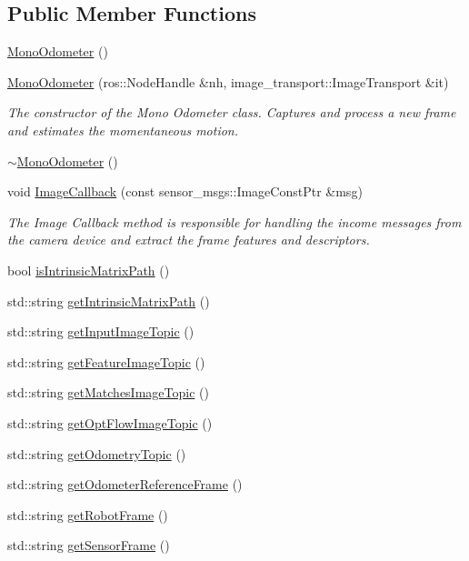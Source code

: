 \subsection*{\-Public \-Member \-Functions}
\begin{DoxyCompactItemize}
\item 
\hyperlink{classLRM_1_1MonoOdometer_a1ea1f329885905fcab0e3f790253df9d}{\-Mono\-Odometer} ()
\item 
\hyperlink{classLRM_1_1MonoOdometer_ae849abdcd3e0b49be6b1672b292c86ba}{\-Mono\-Odometer} (ros\-::\-Node\-Handle \&nh, image\-\_\-transport\-::\-Image\-Transport \&it)
\begin{DoxyCompactList}\small\item\em \-The constructor of the \-Mono \-Odometer class. \-Captures and process a new frame and estimates the momentaneous motion. \end{DoxyCompactList}\item 
\hyperlink{classLRM_1_1MonoOdometer_aadca97effbd3970022f8fdfa42c1177b}{$\sim$\-Mono\-Odometer} ()
\item 
void \hyperlink{classLRM_1_1MonoOdometer_a7205e77893b1f9d4c37de616519ef5ed}{\-Image\-Callback} (const sensor\-\_\-msgs\-::\-Image\-Const\-Ptr \&msg)
\begin{DoxyCompactList}\small\item\em \-The \-Image \-Callback method is responsible for handling the income messages from the camera device and extract the frame features and descriptors. \end{DoxyCompactList}\item 
bool \hyperlink{classLRM_1_1MonoOdometer_aaea86d0c2fc1119b066b310451be4a67}{is\-Intrinsic\-Matrix\-Path} ()
\item 
std\-::string \hyperlink{classLRM_1_1MonoOdometer_ab75736159a13ba537ed8615c84853243}{get\-Intrinsic\-Matrix\-Path} ()
\item 
std\-::string \hyperlink{classLRM_1_1MonoOdometer_a3174620fdca5f375ec38bc0709c2e1e0}{get\-Input\-Image\-Topic} ()
\item 
std\-::string \hyperlink{classLRM_1_1MonoOdometer_a68f5f4b33141cd2a2ea92db6197db65c}{get\-Feature\-Image\-Topic} ()
\item 
std\-::string \hyperlink{classLRM_1_1MonoOdometer_a0b5b603776c1c011d1268dc029dee6ae}{get\-Matches\-Image\-Topic} ()
\item 
std\-::string \hyperlink{classLRM_1_1MonoOdometer_acde0fd05b19f524bace7c71de9a0cc36}{get\-Opt\-Flow\-Image\-Topic} ()
\item 
std\-::string \hyperlink{classLRM_1_1MonoOdometer_a16eaa3716cb077ef993fa66a582fe65e}{get\-Odometry\-Topic} ()
\item 
std\-::string \hyperlink{classLRM_1_1MonoOdometer_ac989d0a61c0b18c7e538732668953fa1}{get\-Odometer\-Reference\-Frame} ()
\item 
std\-::string \hyperlink{classLRM_1_1MonoOdometer_a3550a896dd2e212fa177d7401f1a5b61}{get\-Robot\-Frame} ()
\item 
std\-::string \hyperlink{classLRM_1_1MonoOdometer_a72b47de741d2c273a34c7d4e9a093092}{get\-Sensor\-Frame} ()
\end{DoxyCompactItemize}

